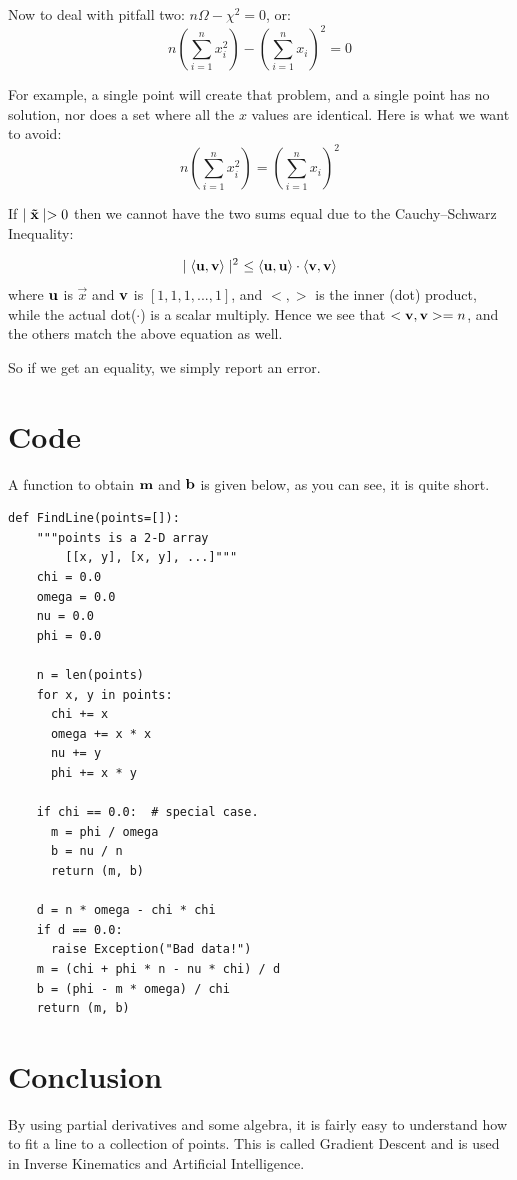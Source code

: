 \documentclass{article}
\begin{document}
Now to deal with pitfall two: $n \Omega - \chi^2 = 0$, or:
\begin{equation}
n  \left( \sum_{i=1}^n x_i^2 \right) - \left( \sum_{i=1}^n x_i \right)^2 = 0
\end{equation}

For example, a single point will create that problem, and a single point
has no solution, nor does a set where all the $x$ values are identical. Here is what we want to avoid:
\begin{equation}
n  \left( \sum_{i=1}^n x_i^2 \right) = \left( \sum_{i=1}^n x_i \right)^2
\end{equation}

If $\mid{\bf \vec{x} }\mid > 0$ then we cannot have the two sums equal due to
the  Cauchy–Schwarz Inequality:

\begin{equation}
\mid\left<{\bf u},{\bf v}\right>\mid^2 \
\le \left<{\bf u},{\bf u}\right>\cdot\left<{\bf v},{\bf v}\right>
\end{equation} 
where ${\bf u}$ is $\vec{x}$ and ${\bf v}$ is $[1, 1, 1, ..., 1]$, and
$< , >$ is the inner (dot) product, while the actual dot($\cdot$) is a
scalar multiply.   Hence we see that $<{\bf v}, {\bf v}> = n$, and the others
match the above equation as well.

So if we get an equality, we simply report an error.

\vfill

\section{Code}
A function to obtain ${\bf m}$ and ${\bf b}$ is given below, as you can see,
it is quite short.
\lstset{language=Python}
\begin{lstlisting}[frame=single]
def FindLine(points=[]):
    """points is a 2-D array
        [[x, y], [x, y], ...]"""
    chi = 0.0
    omega = 0.0
    nu = 0.0
    phi = 0.0

    n = len(points)
    for x, y in points:
      chi += x
      omega += x * x
      nu += y
      phi += x * y

    if chi == 0.0:  # special case.
      m = phi / omega
      b = nu / n
      return (m, b)

    d = n * omega - chi * chi
    if d == 0.0:
      raise Exception("Bad data!")
    m = (chi + phi * n - nu * chi) / d
    b = (phi - m * omega) / chi
    return (m, b)
\end{lstlisting}

\section{Conclusion}

By using partial derivatives and some algebra, it is fairly easy to
understand how to fit a line to a collection of points.  This is
called Gradient Descent and is used in Inverse Kinematics and
Artificial Intelligence.
\end{document}
